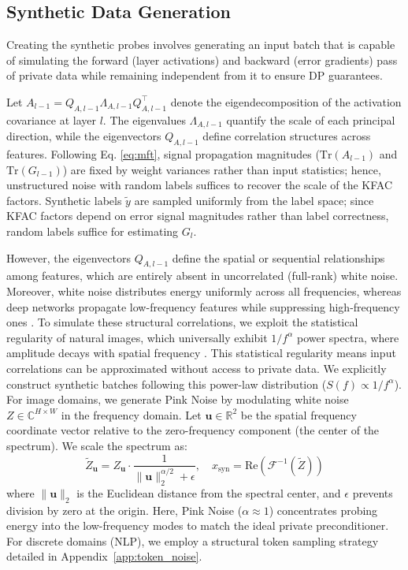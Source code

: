 \documentclass{article}
\theoremstyle{plain}
\theoremstyle{definition}
\theoremstyle{remark}
\begin{document}
\subsection{Synthetic Data Generation}
\label{sec:signal_variance}

Creating the synthetic probes involves generating an input batch that is capable of simulating the forward (layer activations) and backward (error gradients) pass of private data while remaining independent from it to ensure DP guarantees. 

Let $A_{l-1} = Q_{A,l-1} \Lambda_{A,l-1} Q_{A,l-1}^\top$ denote the eigendecomposition of the activation covariance at layer $l$.
The eigenvalues $\Lambda_{A,l-1}$ quantify the scale of each principal direction, while the eigenvectors $Q_{A,l-1}$ define correlation structures across features. Following Eq. \ref{eq:mft}, signal propagation magnitudes ($\mathrm{Tr}(A_{l-1})$ and $\mathrm{Tr}(G_{l-1})$) are fixed by weight variances rather than input statistics; hence, unstructured noise with random labels suffices to recover the scale of the KFAC factors. Synthetic labels $\tilde{y}$ are sampled uniformly from the label space; since KFAC factors depend on error signal magnitudes rather than label correctness, random labels suffice for estimating $G_l$.

However, the eigenvectors $Q_{A,l-1}$ define the spatial or sequential relationships among features, which are entirely absent in uncorrelated (full-rank) white noise. Moreover, white noise distributes energy uniformly across all frequencies, whereas deep networks propagate low-frequency features while suppressing high-frequency ones \cite{rahaman2019spectralbiasneuralnetworks}. 
To simulate these structural correlations, we exploit the statistical regularity of natural images, which universally exhibit $1/f^\alpha$ power spectra, where amplitude decays with spatial frequency \cite{field1987relations}. This statistical regularity means input correlations can be approximated without access to private data. We explicitly construct synthetic batches following this power-law distribution ($S(f) \propto 1/f^\alpha$). For image domains, we generate Pink Noise by modulating white noise $Z \in \mathbb{C}^{H \times W}$ in the frequency domain. Let $\mathbf{u} \in \mathbb{R}^2$ be the spatial frequency coordinate vector relative to the zero-frequency component (the center of the spectrum). We scale the spectrum as:
\begin{equation}
    \label{eq:pink_noise_gen}
    \tilde{Z}_{\mathbf{u}} = Z_{\mathbf{u}} \cdot \frac{1}{\|\mathbf{u}\|_2^{\alpha/2} + \epsilon}, \quad x_{\text{syn}} = \text{Re}(\mathcal{F}^{-1}(\tilde{Z}))
\end{equation}
where $\|\mathbf{u}\|_2$ is the Euclidean distance from the spectral center, and $\epsilon$ prevents division by zero at the origin. Here, Pink Noise ($\alpha \approx 1$) concentrates probing energy into the low-frequency modes to match the ideal private preconditioner. For discrete domains (NLP), we employ a structural token sampling strategy detailed in Appendix~\ref{app:token_noise}.
\end{document}
